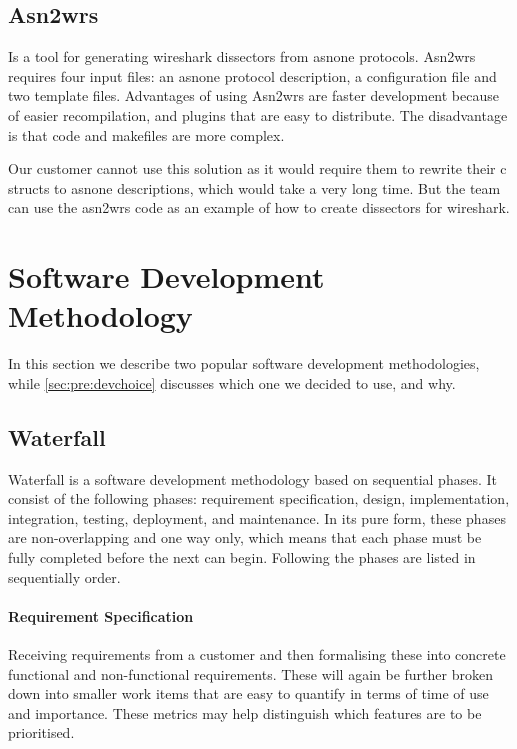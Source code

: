 \subsection{Asn2wrs}
Is a tool for generating \Gls{wireshark} \glspl{dissector} from \gls{asnone} \glspl{protocol}. Asn2wrs requires
four input files: an \gls{asnone} \gls{protocol} description, a configuration file and two
template files. Advantages of using Asn2wrs are faster development because of
easier recompilation, and plugins that are easy to distribute. The disadvantage
is that code and \glspl{makefile} are more complex.\cite{asn2wrs} 

Our customer cannot use this solution as it would require them to rewrite 
their \Gls{c} \glspl{struct} to \gls{asnone} descriptions, which would take a 
very long time. But the team can use the asn2wrs code as an example of how to 
create dissectors for \Gls{wireshark}.

\section{Software Development Methodology}
\label{sec:pre:method}
In this section we describe two popular software development methodologies,
while \autoref{sec:pre:devchoice} discusses which one we decided to use, and
why.

\subsection{Waterfall}
\label{sec:pre:waterfall}
Waterfall is a software development methodology based on sequential phases.
It consist of the following phases: requirement specification, design,
implementation, integration, testing, deployment, and maintenance. In its pure
form, these phases are non-overlapping and one way only, which means that each
phase must be fully completed before the next can begin. Following the phases are listed in sequentially order.  

\paragraph{Requirement Specification}
Receiving requirements from a customer and then formalising
these into concrete functional and non-functional requirements. These will
again be further broken down into smaller work items that are easy to quantify
in terms of time of use and importance. These metrics may help distinguish
which features are to be prioritised.

